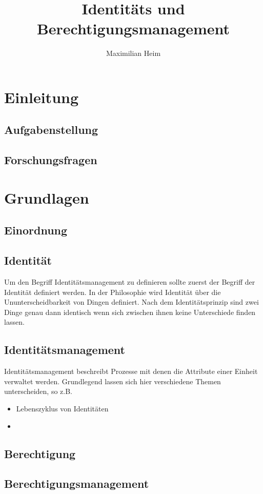 \documentclass[10pt]{article}
\author{Maximilian Heim}
\title{Identitäts und Berechtigungsmanagement}
\begin{document}
\maketitle
\newpage
\tableofcontents
\newpage
\section{Einleitung}
\subsection{Aufgabenstellung}
\subsection{Forschungsfragen}
\section{Grundlagen}
\subsection{Einordnung}
\subsection{Identität}
Um den Begriff Identitätsmanagement zu definieren sollte zuerst der Begriff der Identität definiert werden. In der Philosophie wird Identität über die Ununterscheidbarkeit von Dingen definiert. Nach dem Identitätsprinzip sind zwei Dinge genau dann identisch wenn sich zwischen ihnen keine Unterschiede finden lassen.
\subsection{Identitätsmanagement}
Identitätsmanagement beschreibt Prozesse mit denen die Attribute einer Einheit verwaltet werden. Grundlegend lassen sich hier verschiedene Themen unterscheiden, so z.B.
\begin{itemize}
  \item Lebenszyklus von Identitäten
  \item
\end{itemize}
\subsection{Berechtigung}
\subsection{Berechtigungsmanagement}
\end{document}
